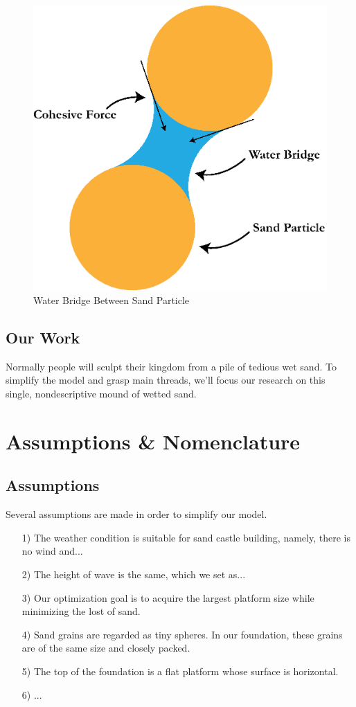 \documentclass[12pt]{article}
\begin{document}
\begin{figure}
    \centering
    \includegraphics[width=0.5\linewidth]{water_bridge.eps}
    \caption{Water Bridge Between Sand Particle}
    \label{fig:water_bridge}
\end{figure}

\subsection{Our Work}
Normally people will sculpt their kingdom from a pile of tedious wet sand. To simplify the model and grasp main threads, we'll focus our research on this single, nondescriptive mound of wetted sand.

\section{Assumptions \& Nomenclature}
\subsection{Assumptions}
Several assumptions are made in order to simplify our model.
\begin{itemize}
	\item [1)] 
	The weather condition is suitable for sand castle building, namely, there is no wind and...
	\item [2)]
	The height of wave is the same, which we set as...
	\item [3)]
	Our optimization goal is to acquire the largest platform size while minimizing the lost of sand.
	\item [4)]
	Sand grains are regarded as tiny spheres. In our foundation, these grains are of the same size and closely packed. 
	\item [5)]
	The top of the foundation is a flat platform whose surface is horizontal.
	\item [6)]
	...
\end{itemize}
\end{document}
